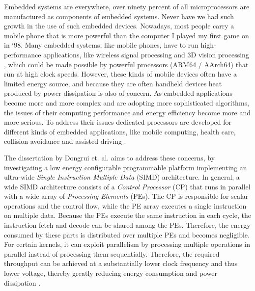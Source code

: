 



Embedded systems are everywhere, over ninety percent of all microprocessors are manufactured as components of embedded systems.
Never have we had such growth in the use of such embedded devices. Nowadays, most people carry a mobile phone that is more powerful than the computer I played my first game on in `98. %
Many embedded systems, like mobile phones, have to run high-performance applications, like wireless signal processing and 3D vision processing \cite{dongrio1}, which could be made possible by powerful processors (ARM64 / AArch64) that run at high clock speeds. However, these kinds of mobile devices often have a limited energy source, and because they are often handheld devices heat produced by power dissipation is also of concern. As embedded applications become more and more complex and are adopting more sophisticated algorithms, the issues of their computing performance and energy efficiency become more and more serious. To address their issues dedicated processors are developed for different kinds of embedded applications, like mobile computing, health care, collision avoidance and assisted driving \cite{lechjozwiak}.

The dissertation by Dongrui et. al. \cite{dongrui} aims to address these concerns, by investigating a low energy configurable programmable platform implementing an ultra-wide \emph{Single Instruction Multiple Data} (SIMD) architecture. In general, a wide SIMD architecture consists of a \emph{Control Processor} (CP) that runs in parallel with a wide array of \emph{Processing Elements} (PEs). The CP is responsible for scalar operations and the control flow, while the PE array executes a single instruction on multiple data. Because the PEs execute the same instruction in each cycle, the instruction fetch and decode can be shared among the PEs. Therefore, the energy consumed by these parts is distributed over multiple PEs and becomes negligible. For certain kernels, it can exploit parallelism by processing multiple operations in parallel instead of processing them sequentially. Therefore, the required throughput can be achieved at a substantially lower clock frequency and thus lower voltage, thereby greatly reducing energy consumption and power dissipation \cite{dongrio2}.%

